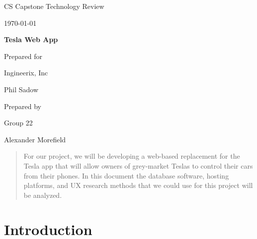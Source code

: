 \documentclass[onecolumn, draftclsnofoot,10pt, compsoc]{IEEEtran}
\def \CapstoneTeamNumber{		22}
\def \GroupMemberOne{			Alexander Morefield}
\def \CapstoneProjectName{		Tesla Web App}
\def \CapstoneSponsorCompany{	Ingineerix, Inc}
\def \CapstoneSponsorPerson{	Phil Sadow}
\def \DocType{	%
				Technology Review
				}
\newcommand{\NameSigPair}[1]{\par
\makebox[2.75in][r]{#1} \hfil 	\makebox[3.25in]{\makebox[2.25in]{\hrulefill} \hfill		\makebox[.75in]{\hrulefill}}
\par\vspace{-12pt} \textit{\tiny\noindent
\makebox[2.75in]{} \hfil		\makebox[3.25in]{\makebox[2.25in][r]{Signature} \hfill	\makebox[.75in][r]{Date}}}}
\renewcommand{\NameSigPair}[1]{#1}
\begin{document}
\begin{titlepage}
    \begin{singlespace}
        \hfill 
        \par\vspace{.2in}
        \centering
        \scshape{
            \huge CS Capstone \DocType \par
            {\large\today}\par
            \vspace{.5in}
            \textbf{\Huge\CapstoneProjectName}\par
            \vfill
            {\large Prepared for}\par
            \Huge \CapstoneSponsorCompany\par
            \vspace{5pt}
            {\Large\NameSigPair{\CapstoneSponsorPerson}\par}
            {\large Prepared by }\par
            Group\CapstoneTeamNumber\par
            \vspace{5pt}
            {\Large
                \NameSigPair{\GroupMemberOne}\par
            }
            \vspace{20pt}
        }
        \begin{abstract}
        	For our project, we will be developing a web-based replacement for the Tesla app that will allow owners of grey-market Teslas to control their cars from their phones. 
        	In this document the database software, hosting platforms, and UX research methods that we could use for this project will be analyzed.
        \end{abstract}     
    \end{singlespace}
\end{titlepage}
\newpage
{}
\tableofcontents
\clearpage

\section{Introduction}
\end{document}

